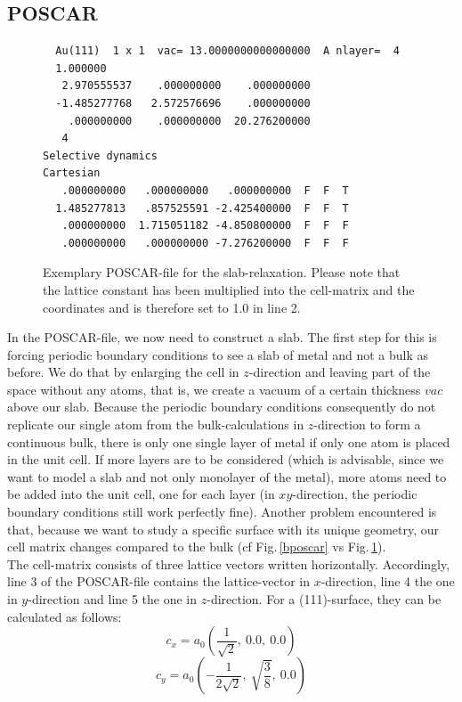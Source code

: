 \documentclass[twoside, 11pt, titlepage, captions=nooneline, a4paper, headsepline]{scrbook}%
\begin{document}
\subsection{POSCAR}
\begin{figure}[h!!]
\begin{verbatim}
  Au(111)  1 x 1  vac= 13.0000000000000000  A nlayer=  4
  1.000000
   2.970555537    .000000000    .000000000
  -1.485277768   2.572576696    .000000000
    .000000000    .000000000  20.276200000
   4
Selective dynamics
Cartesian
   .000000000   .000000000   .000000000  F  F  T
  1.485277813   .857525591 -2.425400000  F  F  T
   .000000000  1.715051182 -4.850800000  F  F  F
   .000000000   .000000000 -7.276200000  F  F  F
\end{verbatim}
\caption{Exemplary POSCAR-file for the slab-relaxation. Please note that the lattice constant has been multiplied into the cell-matrix and the coordinates and is therefore set to 1.0 in line 2.}
\label{spos}
\end{figure}
In the POSCAR-file, we now need to construct a slab. The first step for this is forcing periodic boundary conditions to see a slab of metal and not a bulk as before. We do that by enlarging the cell in $z$-direction and leaving part of the space without any atoms, that is, we create a vacuum of a certain thickness $vac$ above our slab. Because the periodic boundary conditions consequently do not replicate our single atom from the bulk-calculations in $z$-direction to form a continuous bulk, there is only one single layer of metal if only one atom is placed in the unit cell. If more layers are to be considered (which is advisable, since we want to model a slab and not only monolayer of the metal), more atoms need to be added into the unit cell, one for each layer (in $xy$-direction, the periodic boundary conditions still work perfectly fine). Another problem encountered is that, because we want to study a specific surface with its unique geometry, our cell matrix changes compared to the bulk (cf Fig.\,\ref{bposcar} vs Fig.\,\ref{spos}).\\
The cell-matrix consists of three lattice vectors written horizontally. Accordingly, line 3 of the POSCAR-file contains the lattice-vector in $x$-direction, line 4 the one in $y$-direction and line 5 the one in $z$-direction. For a (111)-surface, they can be calculated as follows:
\begin{equation}
c_x=a_0\left(\frac{1}{\sqrt{2}}, ~0.0, ~0.0\right)
\end{equation}
\begin{equation}
c_y=a_0\left(-\frac{1}{2\sqrt{2}}, ~\sqrt{\frac{3}{8}}, ~0.0\right)
\end{equation}
\end{document}
